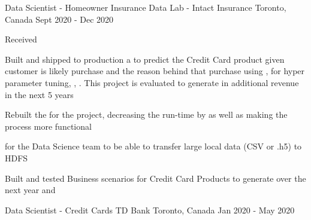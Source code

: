 

\begin{cventries}
  \cventry
    {Data Scientist - Homeowner Insurance} %
    {Data Lab - Intact Insurance} %
    {Toronto, Canada} %
    {Sept 2020 - Dec 2020} %
    {
      \begin{cvitems} %
        \item {Received }
        \item {Built and shipped to production a  to predict the Credit Card product given customer is likely purchase and the reason behind that purchase using ,  for hyper parameter tuning, , . This project is evaluated to generate  in additional revenue in the next 5 years}
        \item {Rebuilt the  for the project, decreasing the run-time by  as well as making the process more functional}
        \item{ for the Data Science team to be able to transfer large local data (CSV or .h5) to HDFS}
        \item {Built and tested Business scenarios for Credit Card Products to generate  over the next year and }
      \end{cvitems}
    }
  \cventry
    {Data Scientist - Credit Cards} %
    {TD Bank} %
    {Toronto, Canada} %
    {Jan 2020 - May 2020} %
    {
      \begin{cvitems} %

\end{cvitems}}
\end{cventries}
